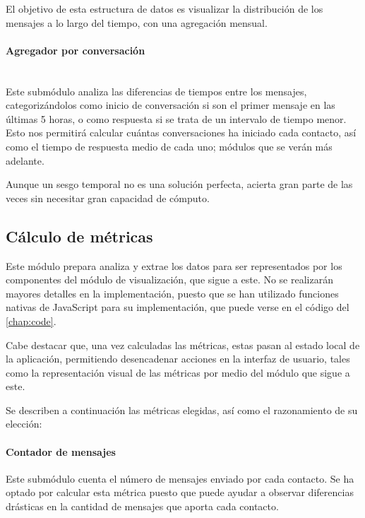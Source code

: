 El objetivo de esta estructura de datos es visualizar la distribución de los mensajes a lo largo del tiempo, con una agregación mensual.

\paragraph{Agregador por conversación}\mbox{}\\

Este submódulo analiza las diferencias de tiempos entre los mensajes, categorizándolos como inicio de conversación si son el primer mensaje en las últimas 5 horas, o como respuesta si se trata de un intervalo de tiempo menor. Esto nos permitirá calcular cuántas conversaciones ha iniciado cada contacto, así como el tiempo de respuesta medio de cada uno; módulos que se verán más adelante.

Aunque un sesgo temporal no es una solución perfecta, acierta gran parte de las veces sin necesitar gran capacidad de cómputo.

\subsection{Cálculo de métricas}
\label{chap:architecture_metrics}

Este módulo prepara analiza y extrae los datos para ser representados por los componentes del módulo de visualización, que sigue a este. No se realizarán mayores detalles en la implementación, puesto que se han utilizado funciones nativas de JavaScript para su implementación, que puede verse en el código del \autoref{chap:code}. 

Cabe destacar que, una vez calculadas las métricas, estas pasan al estado local de la aplicación, permitiendo desencadenar acciones en la interfaz de usuario, tales como la representación visual de las métricas por medio del módulo que sigue a este.

Se describen a continuación las métricas elegidas, así como el razonamiento de su elección:

\paragraph{Contador de mensajes}

Este submódulo cuenta el número de mensajes enviado por cada contacto. Se ha optado por calcular esta métrica puesto que puede ayudar a observar diferencias drásticas en la cantidad de mensajes que aporta cada contacto.

